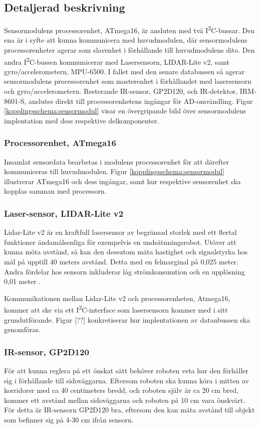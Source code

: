 \documentclass[11pt]{article}
\begin{document}
\begin{flushleft}
\begin{itemize}
\end{itemize}

\subsection{Detaljerad beskrivning}

Sensormodulens processorenhet, ATmega16, är ansluten med två I\textsuperscript{2}C-bussar. Den ena är i syfte att kunna kommunicera med huvudmodulen, där sensormodulens processorenheter agerar som slavenhet i förhållande till huvudmodulens dito. Den andra I\textsuperscript{2}C-bussen kommunicerar med Lasersensorn, LIDAR-Lite v2, samt gyro/accelerometern, MPU-6500. I fallet med den senare databussen så agerar sensormodulens processorenhet som masterenhet i förhållandet med lasersensorn och gyro/accelerometern.
Resterande IR-sensor, GP2D120, och IR-detektor, IRM-8601-S, anslutes direkt till processorenhetens ingångar för AD-omvändling. Figur \ref{kopplingsschema:sensormodul} visar en övergripande bild över sensormodulens implentation med dess respektive delkomponenter. 

\subsubsection{Processorenhet, ATmega16}
Insamlat sensordata bearbetas i modulens processorenhet för att därefter kommuniceras till huvudmodulen. Figur \ref{kopplingsschema:sensormodul} illustrerar ATmega16 och dess ingångar, samt hur respektive sensorenhet ska kopplas samman med processorn. 

\subsubsection{Laser-sensor, LIDAR-Lite v2}
Lidar-Lite v2 är en kraftfull lasersensor av begränsad storlek med ett flertal funktioner ändamålsenliga för exempelvis en undsätnningsrobot. Utöver att kunna möta avstånd, så kan den dessutom mäta hastighet och signalstyrka hos mål på upptill 40 meters avstånd. Detta med en felmarginal på 0,025 meter. Andra fördelar hos sensorn inkluderar låg strömkonsumtion och en upplösning 0,01 meter \cite{7131685}.

Kommunikationen mellan Lidar-Lite v2 och processorenheten, Atmega16, kommer att ske via ett I\textsuperscript{2}C-interface som lasersensorn kommer med i sitt grundutförande. Figur [??] konkretiserar hur implentationen av datanbussen ska genomföras. 

\subsubsection{IR-sensor, GP2D120}
För att kunna reglera på ett önskat sätt behöver roboten veta hur den förhåller sig i förhållande till sidoväggarna. Eftersom roboten ska kunna köra i mitten av korridorer med ca 40 centimeters bredd, och roboten själv är ca 20 cm bred, kommer ett avstånd mellan sidoväggarna och roboten på 10 cm vara önskvärt. För detta är IR-sensorn GP2D120 bra, eftersom den kan mäta avstånd till objekt som befinner sig på 4-30 cm ifrån sensorn. 


\end{flushleft}
\end{document}
